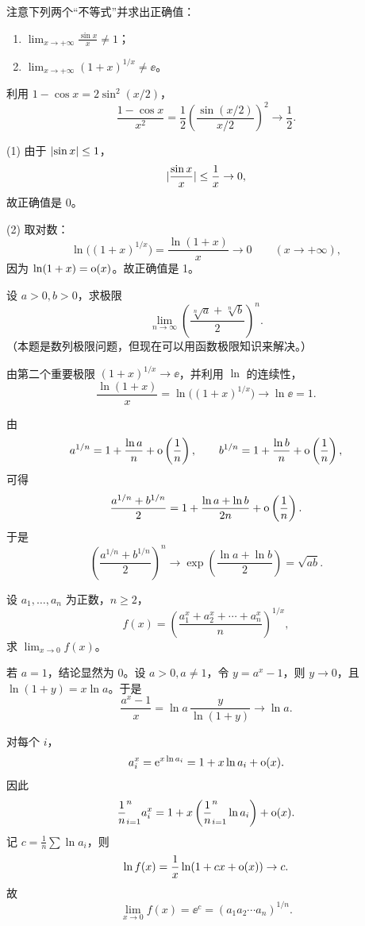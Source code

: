 \begin{xexercise}[2]
注意下列两个“不等式”并求出正确值：
  \begin{enumerate}
    \item $\displaystyle\lim_{x\to+\infty}\frac{\sin x}{x}\ne1$；
    \item $\displaystyle\lim_{x\to+\infty}(1+x)^{1/x}\ne\ee$。
  \end{enumerate}
\end{xexercise}
\begin{xsolution}
利用 $1-\cos x=2\sin^2(x/2)$，
\[
  \frac{1-\cos x}{x^2}
  =\frac12\left(\frac{\sin(x/2)}{x/2}\right)^2\to\frac12.
\]

(1) 由于 $\lvert\sin x\rvert\leq1$，
\[
  \lvert\frac{\sin x}{x}\rvert\leq\frac1x\to0,
\]
故正确值是 0。

(2) 取对数：
\[
  \ln\bigl((1+x)^{1/x}\bigr)=\frac{\ln(1+x)}x\to0
  \qquad(x\to+\infty),
\]
因为 $\ln(1+x)=\mathrm{o}(x)$。故正确值是 1。
\end{xsolution}


\begin{xexercise}[3]
设 $a>0,b>0$，求极限
  \[
    \lim_{n\to\infty}\left(\frac{\sqrt[n]{a}+\sqrt[n]{b}}2\right)^n.
  \]
  （本题是数列极限问题，但现在可以用函数极限知识来解决。）
\end{xexercise}
\begin{xsolution}
由第二个重要极限
$(1+x)^{1/x}\to\ee$，并利用 $\ln$ 的连续性，
\[
  \frac{\ln(1+x)}x
  =\ln\bigl((1+x)^{1/x}\bigr)\to\ln\ee=1.
\]

由
\[
  a^{1/n}=1+\frac{\ln a}{n}+\mathrm{o}\left(\frac1n\right),\qquad
  b^{1/n}=1+\frac{\ln b}{n}+\mathrm{o}\left(\frac1n\right),
\]
可得
\[
  \frac{a^{1/n}+b^{1/n}}2
  =1+\frac{\ln a+\ln b}{2n}+\mathrm{o}\left(\frac1n\right).
\]
于是
\[
  \left(\frac{a^{1/n}+b^{1/n}}2\right)^n
  \to\exp\left(\frac{\ln a+\ln b}{2}\right)=\sqrt{ab}.
\]
\end{xsolution}


\begin{xexercise}[4]
设 $a_1,\ldots,a_n$ 为正数，$n\geq2$，
  \[
    f(x)=\left(\frac{a_1^x+a_2^x+\cdots+a_n^x}{n}\right)^{1/x},
  \]
  求 $\displaystyle\lim_{x\to0}f(x)$。
\end{xexercise}
\begin{xsolution}
若 $a=1$，结论显然为 0。设 $a>0,a\ne1$，令 $y=a^x-1$，则 $y\to0$，且
$\ln(1+y)=x\ln a$。于是
\[
  \frac{a^x-1}{x}
  =\ln a\,\frac{y}{\ln(1+y)}\to\ln a.
\]

对每个 $i$，
\[
  a_i^x=\mathrm{e}^{x\ln a_i}=1+x\ln a_i+\mathrm{o}(x).
\]
因此
\[
  \frac1n\relax_{i=1}^n a_i^x
  =1+x\left(\frac1n\relax_{i=1}^n\ln a_i\right)+\mathrm{o}(x).
\]
记 $c=\frac1n\sum\ln a_i$，则
\[
  \ln f(x)=\frac1x\ln(1+cx+\mathrm{o}(x))\to c.
\]
故
\[
  \lim_{x\to0}f(x)=\ee^c=(a_1a_2\cdots a_n)^{1/n}.
\]
\end{xsolution}


